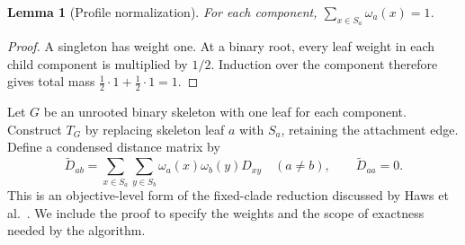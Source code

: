 \documentclass[11pt,a4paper]{article}
\makeatletter
\DeclareRobustCommand{\_}{\ifmmode\nfss@text{\textunderscore}\else\textunderscore\allowbreak\fi}
\newtheorem{lemma}[theorem]{Lemma}
\theoremstyle{definition}
\makeatother
\begin{document}
\begin{lemma}[Profile normalization]
\label{lem:normalization}
For each component, $\sum_{x\in S_a}\omega_a(x)=1$.
\end{lemma}
\begin{proof}
A singleton has weight one.
At a binary root, every leaf weight in each child component is multiplied by $1/2$.
Induction over the component therefore gives total mass
$\tfrac12\cdot1+\tfrac12\cdot1=1$.
\end{proof}

Let $G$ be an unrooted binary skeleton with one leaf for each component.
Construct $T_G$ by replacing skeleton leaf $a$ with $S_a$, retaining the attachment edge.
Define a condensed distance matrix by
\begin{equation}
 \widetilde D_{ab}
 =\sum_{x\in S_a}\sum_{y\in S_b}
    \omega_a(x)\omega_b(y)D_{xy}\quad(a\ne b),
 \qquad \widetilde D_{aa}=0.
 \label{eq:condensed_D}
\end{equation}
This is an objective-level form of the fixed-clade reduction discussed by Haws et al.~\cite[Section~2.4]{haws2011optimality}.
We include the proof to specify the weights and the scope of exactness needed by the algorithm.
\end{document}
